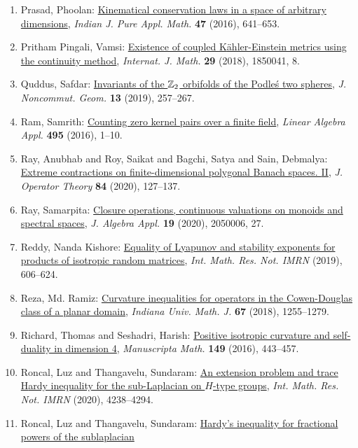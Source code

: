 \begin{enumerate}
\item Prasad, Phoolan: \href{https://doi.org/10.1007/s13226-016-0197-0}{Kinematical conservation laws in a space of arbitrary
dimensions}, \emph{Indian J. Pure Appl. Math.} {\bf 47} (2016), 641--653.
\item Pritham Pingali, Vamsi: \href{https://doi.org/10.1142/S0129167X18500416}{Existence of coupled {K}\"{a}hler-{E}instein metrics using the
continuity method}, \emph{Internat. J. Math.} {\bf 29} (2018), 1850041, 8.
\item Quddus, Safdar: \href{https://doi.org/10.4171/JNCG/320}{Invariants of the {$\Bbb Z_2$} orbifolds of the {P}odle\'{s} two
spheres}, \emph{J. Noncommut. Geom.} {\bf 13} (2019), 257--267.
\item Ram, Samrith: \href{https://doi.org/10.1016/j.laa.2016.01.029}{Counting zero kernel pairs over a finite field}, \emph{Linear Algebra Appl.} {\bf 495} (2016), 1--10.
\item Ray, Anubhab and Roy, Saikat and Bagchi, Satya and Sain,
Debmalya: \href{https://doi.org/10.7900/jot}{Extreme contractions on finite-dimensional polygonal {B}anach
spaces. {II}}, \emph{J. Operator Theory} {\bf 84} (2020), 127--137.
\item Ray, Samarpita: \href{https://doi.org/10.1142/S0219498820500061}{Closure operations, continuous valuations on monoids and
spectral spaces}, \emph{J. Algebra Appl.} {\bf 19} (2020), 2050006, 27.
\item Reddy, Nanda Kishore: \href{https://doi.org/10.1093/imrn/rnx134}{Equality of {L}yapunov and stability exponents for products of
isotropic random matrices}, \emph{Int. Math. Res. Not. IMRN} {\bf } (2019), 606--624.
\item Reza, Md. Ramiz: \href{https://doi.org/10.1512/iumj.2018.67.7320}{Curvature inequalities for operators in the {C}owen-{D}ouglas
class of a planar domain}, \emph{Indiana Univ. Math. J.} {\bf 67} (2018), 1255--1279.
\item Richard, Thomas and Seshadri, Harish: \href{https://doi.org/10.1007/s00229-015-0790-2}{Positive isotropic curvature and self-duality in dimension 4}, \emph{Manuscripta Math.} {\bf 149} (2016), 443--457.
\item Roncal, Luz and Thangavelu, Sundaram: \href{https://doi.org/10.1093/imrn/rny137}{An extension problem and trace {H}ardy inequality for the
sub-{L}aplacian on {$H$}-type groups}, \emph{Int. Math. Res. Not. IMRN} {\bf } (2020), 4238--4294.
\item Roncal, Luz and Thangavelu, Sundaram: \href{https://doi.org/10.1016/j.aim.2016.07.010}{Hardy's inequality for fractional powers of the sublaplacian
}
\end{enumerate}

